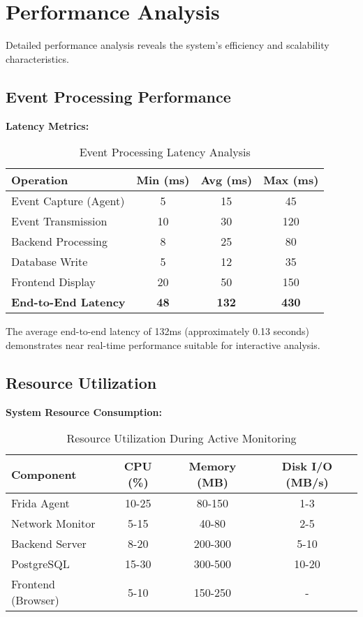 \section{Performance Analysis}

Detailed performance analysis reveals the system's efficiency and scalability characteristics.

\subsection{Event Processing Performance}

\textbf{Latency Metrics:}
\begin{table}[h]
\centering
\begin{tabular}{|l|c|c|c|}
\hline
\textbf{Operation} & \textbf{Min (ms)} & \textbf{Avg (ms)} & \textbf{Max (ms)} \\
\hline
Event Capture (Agent) & 5 & 15 & 45 \\
Event Transmission & 10 & 30 & 120 \\
Backend Processing & 8 & 25 & 80 \\
Database Write & 5 & 12 & 35 \\
Frontend Display & 20 & 50 & 150 \\
\textbf{End-to-End Latency} & \textbf{48} & \textbf{132} & \textbf{430} \\
\hline
\end{tabular}
\caption{Event Processing Latency Analysis}
\end{table}

The average end-to-end latency of 132ms (approximately 0.13 seconds) demonstrates near real-time performance suitable for interactive analysis.

\subsection{Resource Utilization}

\textbf{System Resource Consumption:}

\begin{table}[h]
\centering
\begin{tabular}{|l|c|c|c|}
\hline
\textbf{Component} & \textbf{CPU (\%)} & \textbf{Memory (MB)} & \textbf{Disk I/O (MB/s)} \\
\hline
Frida Agent & 10-25 & 80-150 & 1-3 \\
Network Monitor & 5-15 & 40-80 & 2-5 \\
Backend Server & 8-20 & 200-300 & 5-10 \\
PostgreSQL & 15-30 & 300-500 & 10-20 \\
Frontend (Browser) & 5-10 & 150-250 & - \\
\hline
\end{tabular}
\caption{Resource Utilization During Active Monitoring}
\end{table}

